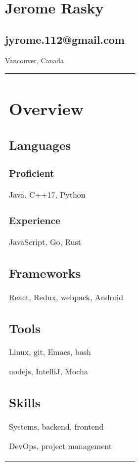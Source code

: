 \documentclass[letterpaper]{article}
\newlength{\leftcol}
\newlength{\rightcol}
\begin{document}
\sffamily
\large
{}

\section*{\Huge Jerome Rasky}
\subsection*{jyrome.112@gmail.com}

Vancouver, Canada

\begin{tabularx}{\textwidth}{@{}p{\leftcol} p{\rightcol}}
\section*{Overview}
\subsection*{Languages}

\subsubsection*{Proficient}

Java, C++17, Python

\subsubsection*{Experience}

JavaScript, Go, Rust

\subsection*{Frameworks}

React, Redux, webpack, Android

\subsection*{Tools}

Linux, git, Emacs, bash

nodejs, IntelliJ, Mocha

\subsection*{Skills}

Systems, backend, frontend

DevOps, project management


\end{tabularx}
\end{document}

